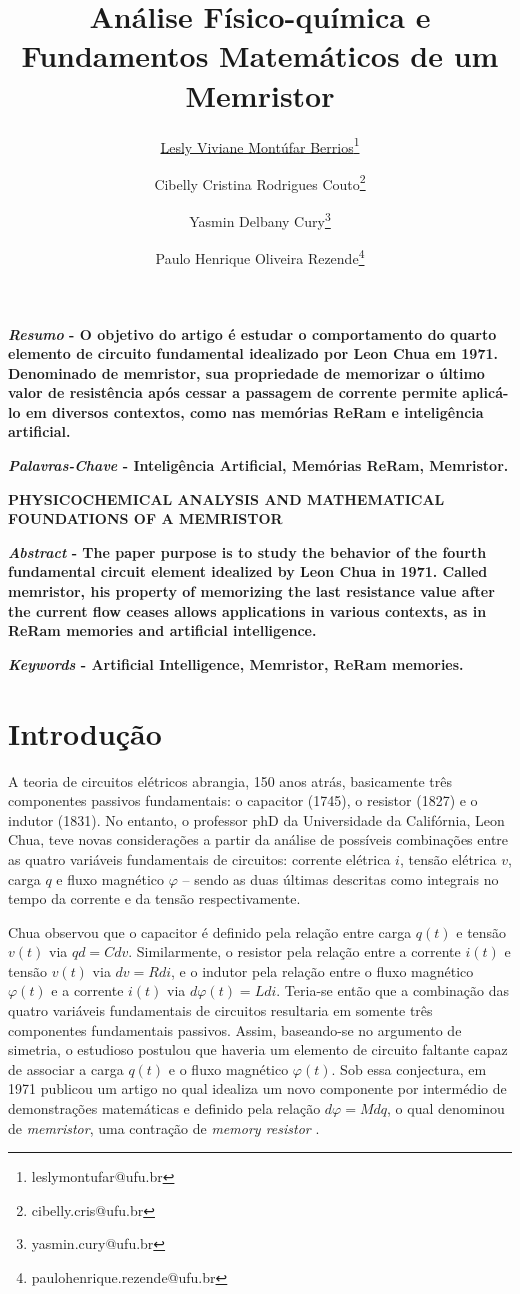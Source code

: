\documentclass{ceel}
\title{Análise Físico-química e Fundamentos Matemáticos de um Memristor}
\author[1]{\underline{Lesly Viviane Montúfar Berrios}\thanks{leslymontufar@ufu.br}}
\author[1]{Cibelly Cristina Rodrigues Couto\thanks{cibelly.cris@ufu.br}}
\author[1]{Yasmin Delbany Cury\thanks{yasmin.cury@ufu.br}}
\author[2]{Paulo Henrique Oliveira Rezende\thanks{paulohenrique.rezende@ufu.br}}
\affil[1]{FEELT - Universidade Federal de Uberlândia}
\affil[2]{FEELT - Professor Adjunto - Universidade Federal de Uberlândia}
\begin{document}
\inserirtitulo

\begin{multicols}{2}

\textbf{\emph{Resumo} - O objetivo do artigo é estudar o comportamento do quarto elemento de circuito fundamental idealizado por Leon Chua em 1971. Denominado de memristor, sua propriedade de memorizar o último valor de resistência após cessar a passagem de corrente permite aplicá-lo em diversos contextos, como nas memórias ReRam e inteligência artificial.}
\vspace*{10pt}

\textbf{\emph{Palavras-Chave} - Inteligência Artificial, Memórias ReRam, Memristor.}


\begin{center}

\noindent\textbf{\large \uppercase{Physicochemical Analysis and Mathematical Foundations of a Memristor}}
\end{center}

\textbf{\emph{Abstract} - The paper purpose is to study the behavior of the fourth fundamental circuit element idealized by Leon Chua in 1971. Called memristor, his property of memorizing the last resistance value after the current flow ceases allows applications in various contexts, as in ReRam memories and artificial intelligence.}
\vspace*{10pt}

\textbf{\emph{Keywords} - Artificial Intelligence, Memristor, ReRam memories.}


\section{Introdução}
A teoria de circuitos elétricos abrangia, 150 anos atrás, basicamente três componentes passivos fundamentais: o capacitor (1745), o resistor (1827) e o indutor (1831). No entanto, o professor phD da Universidade da Califórnia, Leon Chua, teve novas considerações a partir da análise de possíveis combinações entre as quatro variáveis fundamentais de circuitos: corrente elétrica $i$, tensão elétrica $v$, carga $q$ e fluxo magnético $\varphi$ – sendo as duas últimas descritas como integrais no tempo da corrente e da tensão respectivamente.

Chua observou que o capacitor é definido pela relação entre carga $q(t)$ e tensão $v(t)$ via $qd=C dv$. Similarmente, o resistor pela relação entre a corrente $i(t)$ e tensão $v(t)$ via $dv=R di$, e o indutor pela relação entre o fluxo magnético $\varphi(t)$ e a corrente $i(t)$ via $d\varphi(t)=L di$. Teria-se então que a combinação das quatro variáveis fundamentais de circuitos resultaria em somente três componentes fundamentais passivos. Assim, baseando-se no argumento de simetria, o estudioso postulou que haveria um elemento de circuito faltante capaz de associar a carga $q(t)$ e o fluxo magnético $\varphi(t)$. Sob essa conjectura, em 1971 publicou um artigo no qual idealiza um novo componente por intermédio de demonstrações matemáticas e definido pela relação $d\varphi=M dq$, o qual denominou de \emph{memristor}, uma contração de \emph{memory resistor} \cite{artigo}. 


\end{multicols}
\end{document}
